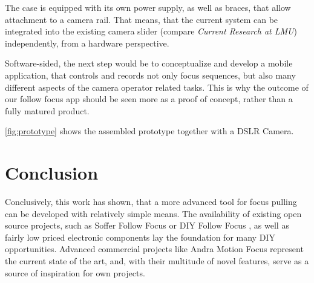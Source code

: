 \documentclass{sigchi}
\begin{document}
The case is equipped with its own power supply, as well as braces, that allow attachment to a camera rail. That means, that the current system can be integrated into the existing camera slider (compare \textit{Current Research at LMU}) independently, from a hardware perspective. 

Software-sided, the next step would be to conceptualize and develop a mobile application, that controls and records not only focus sequences, but also many different aspects of the camera operator related tasks. This is why the outcome of our follow focus app should be seen more as a proof of concept, rather than a fully matured product.

\autoref{fig:prototype} shows the assembled prototype together with a DSLR Camera.

\section{Conclusion}

Conclusively, this work has shown, that a more advanced tool for focus pulling can be developed with relatively simple means. The availability of existing open source projects, such as Soffer Follow Focus \cite{soffer} or DIY Follow Focus \cite{diyff}, as well as fairly low priced electronic components lay the foundation for many DIY opportunities. Advanced commercial projects like Andra Motion Focus \cite{andra} represent the current state of the art, and, with their multitude of novel features, serve as a source of inspiration for own projects.

\balance



\end{document}
